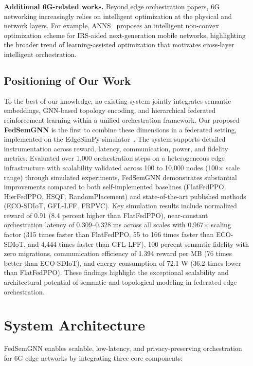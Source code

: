 \documentclass[conference]{IEEEtran}
\begin{document}
		\noindent\textbf{Additional 6G-related works.} Beyond edge orchestration papers, 6G networking increasingly relies on intelligent optimization at the physical and network layers. For example, ANNS~\cite{chen2025anns} proposes an intelligent non-convex optimization scheme for IRS-aided next-generation mobile networks, highlighting the broader trend of learning-assisted optimization that motivates cross-layer intelligent orchestration.
		
		
		\subsection{Positioning of Our Work}
		
		To the best of our knowledge, no existing system jointly integrates semantic embeddings, GNN-based topology encoding, and hierarchical federated reinforcement learning within a unified orchestration framework. Our proposed \textbf{FedSemGNN} is the first to combine these dimensions in a federated setting, implemented on the EdgeSimPy simulator~\cite{souza2023edgesimpy}. The system supports detailed instrumentation across reward, latency, communication, power, and fidelity metrics. Evaluated over 1,000 orchestration steps on a heterogeneous edge infrastructure with scalability validated across 100 to 10,000 nodes (100$\times$ scale range) through simulated experiments, FedSemGNN demonstrates substantial improvements compared to both self-implemented baselines (FlatFedPPO, HierFedPPO, HSQF, RandomPlacement) and state-of-the-art published methods (ECO-SDIoT, GFL-LFF, FRPVC). Key simulation results include normalized reward of 0.91 (8.4 percent higher than FlatFedPPO), near-constant orchestration latency of 0.309--0.328 ms across all scales with 0.967$\times$ scaling factor (315 times faster than FlatFedPPO, 55 to 166 times faster than ECO-SDIoT, and 4,444 times faster than GFL-LFF), 100 percent semantic fidelity with zero migrations, communication efficiency of 1.394 reward per MB (76 times better than ECO-SDIoT), and energy consumption of 72.1 W (36.2 times lower than FlatFedPPO). These findings highlight the exceptional scalability and architectural potential of semantic and topological modeling in federated edge orchestration.
		
		
		\section{System Architecture}
		\label{sec:system_architecture}
		
		FedSemGNN enables scalable, low-latency, and privacy-preserving orchestration for 6G edge networks by integrating three core components:
		
\end{document}
